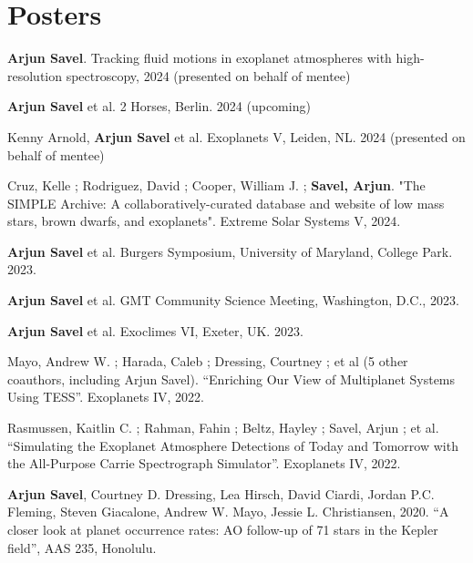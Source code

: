 \documentclass[letterpaper,10.5pt]{article}
\newcommand{\resumeSubHeadingListStart}{\begin{itemize}[leftmargin=*]}
\newcommand{\shorterSection}[1]{\vspace{-10pt}\section{#1}}
\begin{document}
\shorterSection{Posters}
\small
  \begin{list}{}{\cvlist}
  \item[{\color{numcolor}\scriptsize13}] \textbf{Arjun Savel}. Tracking fluid motions in exoplanet atmospheres with high-resolution spectroscopy, 2024 (presented on behalf of mentee)
  \item[{\color{numcolor}\scriptsize12}]\textbf{Arjun Savel} et al. 2 Horses, Berlin. 2024 (upcoming)
  \item[{\color{numcolor}\scriptsize11}]Kenny Arnold, \textbf{Arjun Savel} et al. Exoplanets V, Leiden, NL. 2024 (presented on behalf of mentee)
\item[{\color{numcolor}\scriptsize10}]Cruz, Kelle ; Rodriguez, David ; Cooper, William J. ; \textbf{Savel, Arjun}. "The SIMPLE Archive: A collaboratively-curated database and website of low mass stars, brown dwarfs, and exoplanets". Extreme Solar Systems V, 2024.
  \item[{\color{numcolor}\scriptsize9}]\textbf{Arjun Savel} et al. Burgers Symposium, University of Maryland, College Park. 2023.
  
  \item[{\color{numcolor}\scriptsize8}]\textbf{Arjun Savel} et al. GMT Community Science Meeting, Washington, D.C., 2023.
  
  \item[{\color{numcolor}\scriptsize7}]\textbf{Arjun Savel} et al. Exoclimes VI, Exeter, UK. 2023.

  \item[{\color{numcolor}\scriptsize6}]Mayo, Andrew W. ; Harada, Caleb ; Dressing, Courtney ;  et al (5 other coauthors, including Arjun Savel). ``Enriching Our View of Multiplanet Systems Using TESS''. Exoplanets IV, 2022.

    \item[{\color{numcolor}\scriptsize5}]Rasmussen, Kaitlin C. ; Rahman, Fahin ; Beltz, Hayley ; Savel, Arjun ; et al. ``Simulating the Exoplanet Atmosphere Detections of Today and Tomorrow with the All-Purpose Carrie Spectrograph Simulator''. Exoplanets IV, 2022.
  
  \item[{\color{numcolor}\scriptsize4}]\textbf{Arjun Savel}, Courtney D. Dressing, Lea Hirsch, David Ciardi, Jordan P.C. Fleming, Steven Giacalone, Andrew W. Mayo, Jessie L. Christiansen, 2020. “A closer look at planet occurrence rates: AO follow-up of 71 stars in the Kepler field”, AAS 235, Honolulu.


\end{list}
\end{document}
